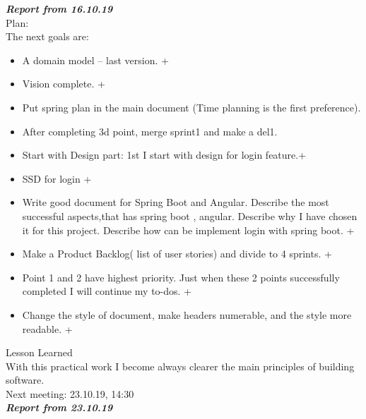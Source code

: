 \documentclass{scrartcl}
\begin{document}
\textbf{\textit{Report from 16.10.19}}\\
Plan:\\
The next goals are:\\
\begin{itemize}


	\item	A domain model – last version. +
	\item	Vision complete. +
	\item	Put spring plan in the main document (Time planning is the first preference).
	\item	After completing 3d point, merge sprint1 and make a del1.
	\item	Start with Design part: 1st I start with design for login feature.+
	\item	SSD for login +
	\item	Write good document for Spring Boot and Angular. Describe the most successful aspects,that has spring boot , angular. Describe why I have chosen it for this project. Describe how can be implement login with spring boot.    +
	\item	Make a Product Backlog( list of user stories) and divide to 4 sprints. +
	\item	Point 1 and 2 have highest priority. Just when these 2 points successfully completed I will continue my  to-dos.  +
	\item	Change the style of document, make headers numerable, and the style more readable.  +
 \end{itemize}
Lesson Learned\\
With this practical work I become always clearer the main principles of building software.\\

Next meeting:		23.10.19, 14:30\\



\textbf{\textit{Report from 23.10.19}}\\
\end{document}
